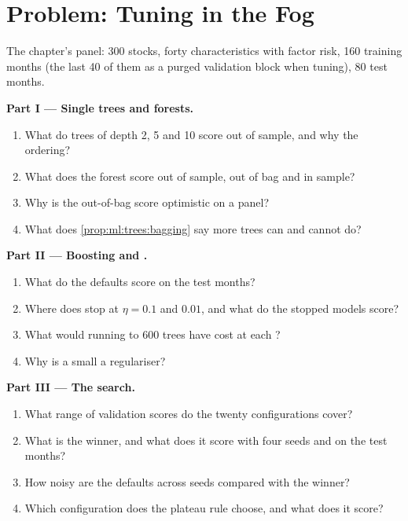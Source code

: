 \section{Problem: Tuning in the Fog}

\begin{problem}\label{pb:ml:trees-and-boosting:1}
The chapter's panel: 300 stocks, forty characteristics with factor risk, 160 training months (the last 40 of them as a
purged validation block when tuning), 80 test months.

\medskip\noindent\textbf{Part I --- Single trees and forests.}
\begin{enumerate}
\item What do trees of depth 2, 5 and 10 score out of sample, and why the ordering?
\item What does the forest score out of sample, out of bag and in sample?
\item Why is the out-of-bag score optimistic on a panel?
\item What does \cref{prop:ml:trees:bagging} say more trees can and cannot do?
\end{enumerate}

\medskip\noindent\textbf{Part II --- Boosting and .}
\begin{enumerate}[resume]
\item What do the defaults score on the test months?
\item Where does  stop at $\eta = 0.1$ and $0.01$, and what do the stopped models score?
\item What would running to 600 trees have cost at each ?
\item Why is a small  a regulariser?
\end{enumerate}

\medskip\noindent\textbf{Part III --- The search.}
\begin{enumerate}[resume]
\item What range of validation scores do the twenty configurations cover?
\item What is the winner, and what does it score with four seeds and on the test months?
\item How noisy are the defaults across seeds compared with the winner?
\item Which configuration does the plateau rule choose, and what does it score?
\end{enumerate}


\end{problem}
